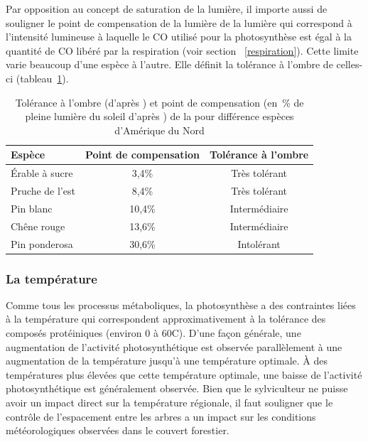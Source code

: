Par opposition au concept de saturation de la lumière, il importe aussi de souligner le point de compensation de la lumière de la lumière qui correspond à l'intensité lumineuse à laquelle le CO utilisé pour la photosynthèse est égal à la quantité de CO libéré par la respiration (voir section ~\ref{respiration}). Cette limite varie beaucoup d'une espèce à l'autre. Elle définit la tolérance à l'ombre de celles-ci (tableau~\ref{tolerance}). 

\begin{table}[h]
\centering
	
	\begin{tabular}{l c c}
	\hline
	\bf Espèce	& \bf Point de compensation & \bf Tolérance à l'ombre \\
	\hline
	\hline
	Érable à sucre & 3,4\% & Très tolérant \\
	Pruche de l'est	& 8,4\%	& Très tolérant \\
	Pin blanc &	10,4\% & Intermédiaire \\
	Chêne rouge	& 13,6\% &  Intermédiaire \\
	Pin ponderosa &	30,6\%	& Intolérant \\
	\hline
	\end{tabular}

\caption{Tolérance à l'ombre (d’après \cite{burns1990silvics}) et point de compensation (en~\% de pleine lumière du soleil d’après \cite{kimmins1987forest}) de la pour différence espèces d'Amérique du Nord }
\label{tolerance}
\end{table}

\subsubsection{La température}

Comme tous les processus métaboliques, la photosynthèse a des contraintes liées à la température qui correspondent approximativement à la tolérance des composés protéiniques (environ 0 à 60\textdegree C). D'une façon générale, une augmentation de l'activité photosynthétique est observée parallèlement à une augmentation de la température jusqu'à une température optimale. À des températures plus élevées que cette température optimale, une baisse de l'activité photosynthétique est généralement observée. Bien que le sylviculteur ne puisse avoir un impact direct sur la température régionale, il faut souligner que le contrôle de l'espacement entre les arbres a un impact sur les conditions météorologiques observées dans le couvert forestier. 

